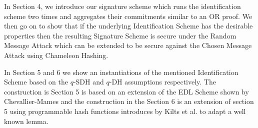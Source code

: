 	 In Section 4, we introduce our signature scheme which runs the identification scheme two times  and aggregates their commitments similar to an OR proof. We then go on to show that if the underlying Identification Scheme has the desirable properties then the resulting Signature Scheme is secure under the Random Message Attack which can be extended to be secure against the Chosen Message Attack using Chameleon Hashing.
	 
	 In Section 5 and 6 we show an instantiations of the mentioned Identification Scheme based on the $q$-SDH and $q$-DH assumptions respectively. The construction is Section 5 is based on an extension of the EDL Scheme shown by Chevallier-Mames and the construction in the Section 6 is an extension of section 5 using programmable hash functions introduces by Kilts et al. to adapt a well known lemma.
